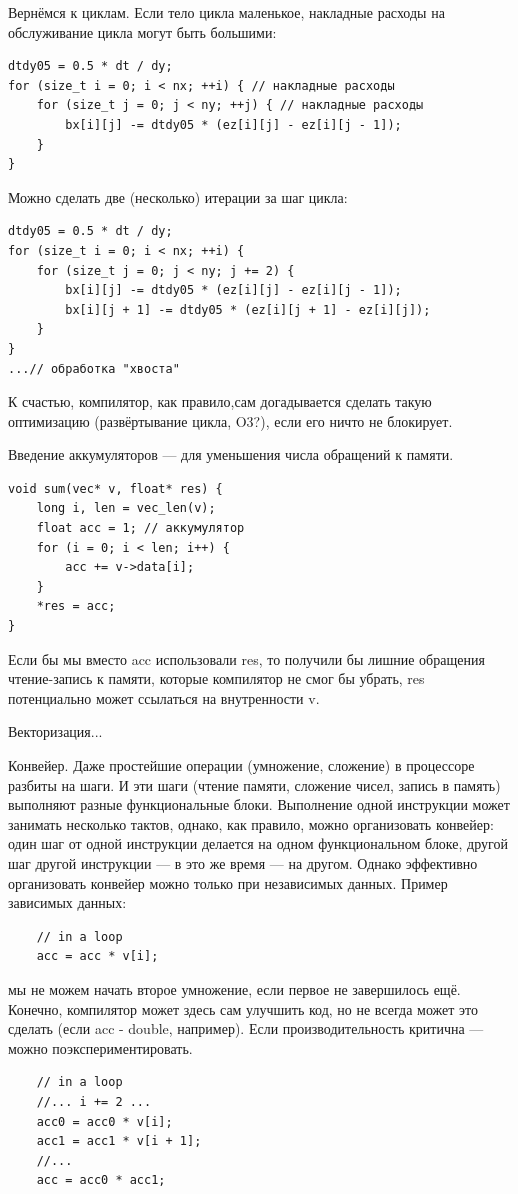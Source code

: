 \documentclass{book}
\begin{document}
Вернёмся к циклам. Если тело цикла маленькое, накладные расходы на обслуживание цикла могут быть
большими:
\begin{verbatim}
dtdy05 = 0.5 * dt / dy;
for (size_t i = 0; i < nx; ++i) { // накладные расходы
    for (size_t j = 0; j < ny; ++j) { // накладные расходы
        bx[i][j] -= dtdy05 * (ez[i][j] - ez[i][j - 1]);
    }
}
\end{verbatim}
Можно сделать две (несколько) итерации за шаг цикла:
\begin{verbatim}
dtdy05 = 0.5 * dt / dy;
for (size_t i = 0; i < nx; ++i) {
    for (size_t j = 0; j < ny; j += 2) {
        bx[i][j] -= dtdy05 * (ez[i][j] - ez[i][j - 1]);
        bx[i][j + 1] -= dtdy05 * (ez[i][j + 1] - ez[i][j]);
    }
}
...// обработка "хвоста"
\end{verbatim}
К счастью, компилятор, как правило,сам догадывается сделать такую оптимизацию (развёртывание
цикла, O3?), если его ничто не блокирует.

Введение аккумуляторов --- для уменьшения числа обращений к памяти.
\begin{verbatim}
void sum(vec* v, float* res) {
    long i, len = vec_len(v);
    float acc = 1; // аккумулятор
    for (i = 0; i < len; i++) {
        acc += v->data[i];
    }
    *res = acc;
}
\end{verbatim}
Если бы мы вместо acc использовали res, то получили бы лишние обращения чтение-запись к памяти,
которые компилятор не смог бы убрать, res потенциально может ссылаться на внутренности v.

Векторизация...

Конвейер. Даже простейшие операции (умножение, сложение) в процессоре разбиты на шаги. И эти шаги
(чтение памяти, сложение чисел, запись в память) выполняют разные функциональные блоки. Выполнение
одной инструкции может занимать несколько тактов, однако, как правило, можно организовать конвейер:
один шаг от одной инструкции делается на одном функциональном блоке, другой шаг другой инструкции
--- в это же время --- на другом. Однако эффективно организовать конвейер можно только при
независимых данных. Пример зависимых данных:
\begin{verbatim}
    // in a loop
    acc = acc * v[i];
\end{verbatim}
мы не можем начать второе умножение, если первое не завершилось ещё. Конечно, компилятор может
здесь сам улучшить код, но не всегда может это сделать (если acc - double, например). Если
производительность критична --- можно поэкспериментировать.
\begin{verbatim}
    // in a loop
    //... i += 2 ...
    acc0 = acc0 * v[i];
    acc1 = acc1 * v[i + 1];
    //...
    acc = acc0 * acc1;
\end{verbatim}
\end{document}

